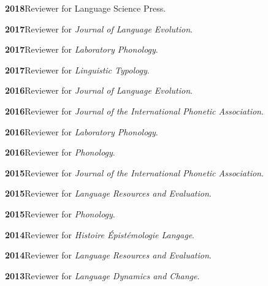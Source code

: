\documentclass[11pt]{article}
\newcommand{\hangpara}{
 \setlength{\parindent}{0in} %
 \hangindent=0.42in %
}
\begin{document}
\vskip 6pt
\hangpara
{\bf 2018}\hspace{1ex}Reviewer for Language Science Press.

\vskip 6pt
\hangpara
{\bf 2017}\hspace{1ex}Reviewer for \textit{Journal of Language Evolution}.

\vskip 6pt
\hangpara
{\bf 2017}\hspace{1ex}Reviewer for \textit{Laboratory Phonology}.

\vskip 6pt
\hangpara
{\bf 2017}\hspace{1ex}Reviewer for \textit{Linguistic Typology}.

\vskip 6pt
\hangpara
{\bf 2016}\hspace{1ex}Reviewer for \textit{Journal of Language Evolution}.

\vskip 6pt
\hangpara
{\bf 2016}\hspace{1ex}Reviewer for \textit{Journal of the International Phonetic Association}.

\vskip 6pt
\hangpara
{\bf 2016}\hspace{1ex}Reviewer for \textit{Laboratory Phonology}.

\vskip 6pt
\hangpara
{\bf 2016}\hspace{1ex}Reviewer for \textit{Phonology}.

\vskip 6pt
\hangpara
{\bf 2015}\hspace{1ex}Reviewer for \textit{Journal of the International Phonetic Association}.


\vskip 6pt
\hangpara
{\bf 2015}\hspace{1ex}Reviewer for \textit{Language Resources and Evaluation}.

\vskip 6pt
\hangpara
{\bf 2015}\hspace{1ex}Reviewer for \textit{Phonology}.

\vskip 6pt
\hangpara
{\bf 2014}\hspace{1ex}Reviewer for \textit{Histoire {\'E}pist{\'e}mologie Langage}.

\vskip 6pt
\hangpara
{\bf 2014}\hspace{1ex}Reviewer for \textit{Language Resources and Evaluation}.

\vskip 6pt
\hangpara
{\bf 2013}\hspace{1ex}Reviewer for \textit{Language Dynamics and Change}.
\end{document}
